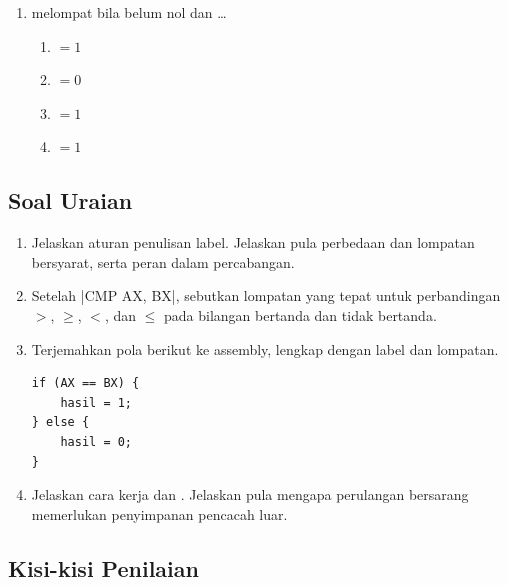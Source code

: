 \begin{enumerate}
    \item {} melompat bila  belum nol dan \dots
          \begin{enumerate}
              \item {} $=1$ \item {} $=0$
              \item {} $=1$ \item {} $=1$
          \end{enumerate}
\end{enumerate}

\subsection{Soal Uraian}

\begin{enumerate}
    \item Jelaskan aturan penulisan label. Jelaskan pula perbedaan
           dan lompatan bersyarat, serta peran 
          dalam percabangan.

    \item Setelah \lstasm|CMP AX, BX|, sebutkan lompatan yang tepat
          untuk perbandingan $>$, $\geq$, $<$, dan $\leq$ pada
          bilangan bertanda dan tidak bertanda.

    \item Terjemahkan pola  berikut ke assembly,
          lengkap dengan label dan lompatan.
          \begin{lstlisting}[language=MASM, numbers=none]
if (AX == BX) {
    hasil = 1;
} else {
    hasil = 0;
}
          \end{lstlisting}

    \item Jelaskan cara kerja  dan . Jelaskan
          pula mengapa perulangan bersarang memerlukan penyimpanan
          pencacah luar.
\end{enumerate}

\subsection{Kisi-kisi Penilaian}


